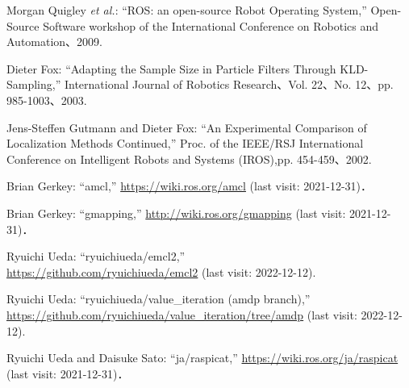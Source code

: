 \documentclass[twocolumn,9pt]{jsproceedings}
\begin{document}
\footnotesize
\begin{thebibliography}{99}
	  Morgan Quigley {\it et al.}: ``ROS: an open-source Robot Operating System,'' 
Open-Source Software workshop of the International Conference on Robotics and Automation、2009. 

Dieter Fox:
``Adapting the Sample Size in Particle Filters Through KLD-Sampling,''
International Journal of Robotics Research、Vol. 22、No. 12、pp. 985-1003、2003. 

Jens-Steffen Gutmann and Dieter Fox: 
``An Experimental Comparison of Localization Methods Continued,''
Proc. of the IEEE/RSJ International Conference on Intelligent Robots and Systems (IROS),pp. 454-459、2002.
  

  
  
  
  Brian Gerkey: ``amcl,'' \url{https://wiki.ros.org/amcl} (last visit: 2021-12-31)．

  Brian Gerkey: ``gmapping,'' \url{http://wiki.ros.org/gmapping} (last visit: 2021-12-31)．
  
  
Ryuichi Ueda: ``ryuichiueda/emcl2,''\\\url{https://github.com/ryuichiueda/emcl2} (last visit: 2022-12-12).

	Ryuichi Ueda: ``ryuichiueda/value\_iteration (amdp branch),''\\\url{https://github.com/ryuichiueda/value_iteration/tree/amdp} (last visit: 2022-12-12).

  Ryuichi Ueda and Daisuke Sato: ``ja/raspicat,'' \url{https://wiki.ros.org/ja/raspicat} (last visit: 2021-12-31)．
  

\end{thebibliography}
\end{document}
